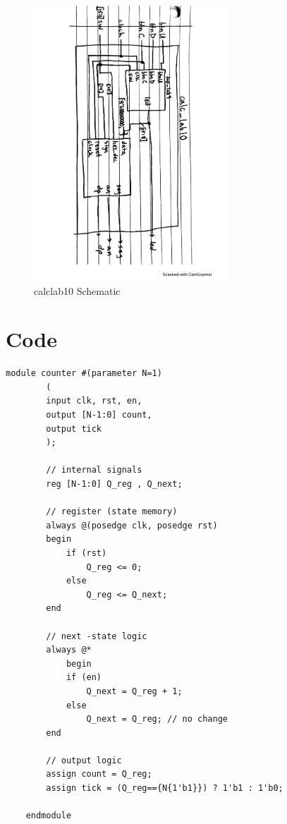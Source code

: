 \documentclass[11pt]{article}
\begin{document}
\begin{figure}[ht]\centering
	\includegraphics[width=0.65\textwidth,trim =0 0 0 0,clip,angle=90,origin=c]{calclab10diagram}
	\caption{calclab10 Schematic}
	\label{fig:sim_with_table}
\end{figure}

\clearpage
\section*{Code}

\begin{lstlisting}[style=Verilog,
caption=Counter Source Code,
label=MUX w/ two inputs Source Code
]
	module counter #(parameter N=1) 
		( 
		input clk, rst, en,
		output [N-1:0] count, 
		output tick 
		);
		
		// internal signals
		reg [N-1:0] Q_reg , Q_next;
		
		// register (state memory)
		always @(posedge clk, posedge rst) 
		begin
			if (rst) 
				Q_reg <= 0; 
			else
				Q_reg <= Q_next;
		end
		
		// next -state logic 
		always @* 
			begin 
			if (en) 
				Q_next = Q_reg + 1; 
			else 
				Q_next = Q_reg; // no change 
		end
		
		// output logic 
		assign count = Q_reg; 
		assign tick = (Q_reg=={N{1'b1}}) ? 1'b1 : 1'b0;
	
	endmodule
\end{lstlisting}
\clearpage
\end{document}
